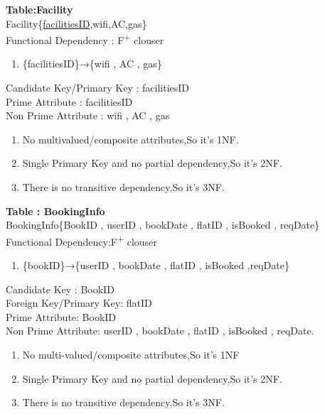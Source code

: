 \noindent
\textbf{Table:Facility }\\
Facility\{\underline{facilitiesID},wifi,AC,gas\}\\
\newline
Functional Dependency : F\textsuperscript{+} clouser
\begin{enumerate}

\item 
\{facilitiesID\}→\{wifi , AC , gas\}
\end{enumerate}
Candidate Key/Primary Key : facilitiesID\\
Prime Attribute : facilitiesID\\
Non Prime Attribute : wifi , AC , gas\\
\begin{enumerate}
\item No multivalued/composite attributes,So it's 1NF.
\item Single Primary Key and no partial dependency,So it's 2NF.
\item There is no transitive dependency,So it's 3NF.\\
\end{enumerate}
\newpage
\noindent
\textbf{Table : BookingInfo }\\
BookingInfo\{BookID , userID , bookDate , flatID , isBooked , reqDate\}\\
\newline
Functional Dependency:F\textsuperscript{+} clouser
\begin{enumerate}
 \item 
 
\{bookID\}→\{userID , bookDate , flatID , isBooked ,reqDate\}
\end{enumerate}
Candidate Key : BookID\\
Foreign Key/Primary Key: flatID\\
Prime Attribute: BookID\\
Non Prime Attribute: userID , bookDate , flatID , isBooked , reqDate.
\begin{enumerate}
\item No multi-valued/composite attributes,So it's 1NF
\item Single Primary Key and no partial dependency,So it's 2NF.
\item There is no transitive dependency,So it's 3NF.\\
\end{enumerate}










\clearpage